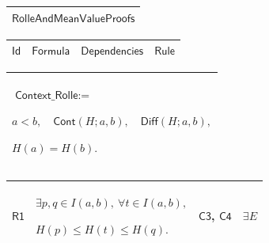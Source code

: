 \documentclass[11pt]{amsart}
\renewcommand{\arraystretch}{1.4}
\newlength{\FTCOneColumnBody}
\newlength{\FTCFourColumnBody}
\begin{document}
{\centering
\renewcommand{\arraystretch}{1.4}
\par\setlength{\parskip}{0pt}\nointerlineskip
\noindent
\begin{tabular}{|@{}>{\centering\arraybackslash}m{\FTCOneColumnBody}|}\hline
$\displaystyle \textsf{RolleAndMeanValueProofs}$\\ \hline
\end{tabular}%
\par\setlength{\parskip}{0pt}\nointerlineskip
\noindent
\begin{tabular}{|@{}>{\centering\arraybackslash}m{0.078431\FTCFourColumnBody}|>{\centering\arraybackslash}m{0.535947\FTCFourColumnBody}|>{\centering\arraybackslash}m{0.281045\FTCFourColumnBody}|>{\centering\arraybackslash}m{0.104575\FTCFourColumnBody}|}\hline
$\displaystyle \textsf{Id}$ & $\displaystyle \textsf{Formula}$ & $\displaystyle \textsf{Dependencies}$ & $\displaystyle \textsf{Rule}$\\ \hline
\end{tabular}%
\par\setlength{\parskip}{0pt}\nointerlineskip
\noindent
\begin{tabular}{|@{}>{\centering\arraybackslash}m{\FTCOneColumnBody}|}\hline
$\displaystyle \textsf{Context\_Rolle}:=$\par
$\displaystyle a<b,\quad\textsf{Cont}(H;a,b),\quad\textsf{Diff}(H;a,b),$\par
$\displaystyle H(a)=H(b).$\\ \hline
\end{tabular}%
\par\setlength{\parskip}{0pt}\nointerlineskip
\noindent
\begin{tabular}{|@{}>{\centering\arraybackslash}m{0.078431\FTCFourColumnBody}|>{\centering\arraybackslash}m{0.535947\FTCFourColumnBody}|>{\centering\arraybackslash}m{0.281045\FTCFourColumnBody}|>{\centering\arraybackslash}m{0.104575\FTCFourColumnBody}|}\hline
\hypertarget{proof:R1}{$\displaystyle \textsf{R1}$} & $\displaystyle \exists p,q\in I(a,b),\ \forall t\in I(a,b),$\par
$\displaystyle H(p)\le H(t)\le H(q).$ & \hyperlink{proof:C3}{$\displaystyle \textsf{C3}$}, \hyperlink{proof:C4}{$\displaystyle \textsf{C4}$} & $\displaystyle \exists E$\\ \hline
\end{tabular}%
\par\setlength{\parskip}{0pt}\nointerlineskip
\noindent
\begin{tabular}{|@{}>{\centering\arraybackslash}m{0.078431\FTCFourColumnBody}|>{\centering\arraybackslash}m{0.535947\FTCFourColumnBody}|>{\centering\arraybackslash}m{0.281045\FTCFourColumnBody}|>{\centering\arraybackslash}m{0.104575\FTCFourColumnBody}|}\hline

\end{tabular}}
\end{document}
